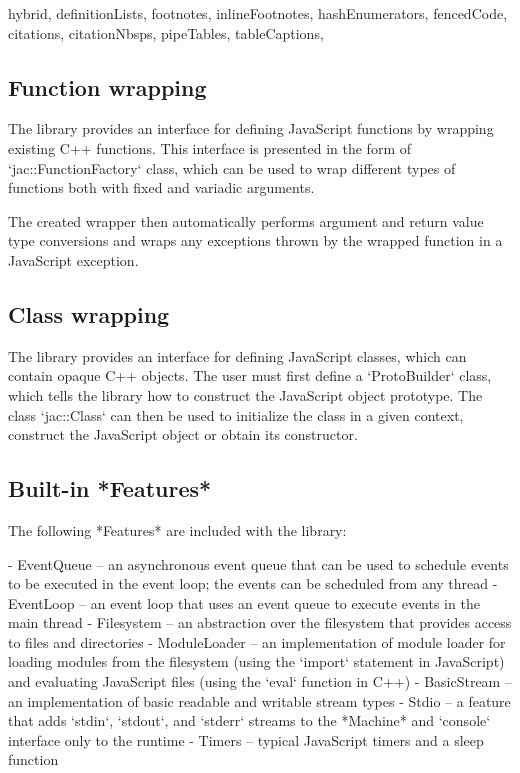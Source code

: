 \documentclass[
  digital,
  oneside,
  nosansbold,
  nocolorbold,
  lof,
  lot
]{fithesis4}
\begin{document}
\begin{markdown*}{%
  hybrid,
  definitionLists,
  footnotes,
  inlineFootnotes,
  hashEnumerators,
  fencedCode,
  citations,
  citationNbsps,
  pipeTables,
  tableCaptions,
}
\subsection{Function wrapping}

The library provides an interface for defining JavaScript functions by wrapping existing C++ functions. This interface is presented in the form of `jac::FunctionFactory` class, which can be used to wrap different types of functions both with fixed and variadic arguments.

The created wrapper then automatically performs argument and return value type conversions and wraps any exceptions thrown by the wrapped function in a JavaScript exception.

\subsection{Class wrapping}

The library provides an interface for defining JavaScript classes, which can contain opaque C++ objects. The user must first define a `ProtoBuilder` class, which tells the library how to construct the JavaScript object prototype. The class `jac::Class` can then be used to initialize the class in a given context, construct the JavaScript object or obtain its constructor.

\subsection{Built-in *Features*}

The following *Features* are included with the library:

  - EventQueue -- an asynchronous event queue that can be used to schedule events to be executed in the event loop; the events can be scheduled from any thread
  - EventLoop -- an event loop that uses an event queue to execute events in the main thread
  - Filesystem -- an abstraction over the filesystem that provides access to files and directories
  - ModuleLoader -- an implementation of module loader for loading modules from the filesystem (using the `import` statement in JavaScript) and evaluating JavaScript files (using the `eval` function in C++)
  - BasicStream -- an implementation of basic readable and writable stream types
  - Stdio -- a feature that adds `stdin`, `stdout`, and `stderr` streams to the *Machine* and `console` interface only to the runtime
  - Timers -- typical JavaScript timers and a sleep function



\end{markdown*}
\end{document}
